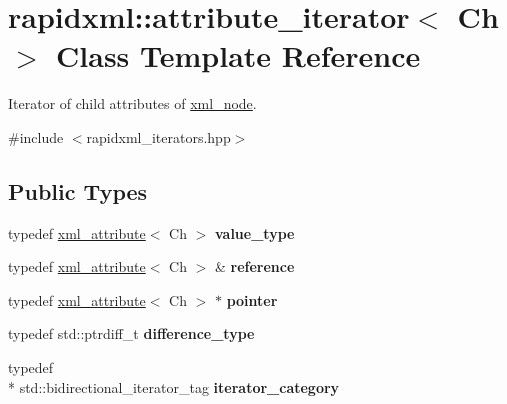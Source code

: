 \hypertarget{classrapidxml_1_1attribute__iterator}{\section{rapidxml\+:\+:attribute\+\_\+iterator$<$ Ch $>$ Class Template Reference}
\label{classrapidxml_1_1attribute__iterator}
}


Iterator of child attributes of \hyperlink{singletonrapidxml_1_1xml__node}{xml\+\_\+node}.  




{\ttfamily \#include $<$rapidxml\+\_\+iterators.\+hpp$>$}

\subsection*{Public Types}
\begin{DoxyCompactItemize}
\item 
\hypertarget{classrapidxml_1_1attribute__iterator_ad4280d358828ad9c3eb1a787decb162e}{typedef \hyperlink{singletonrapidxml_1_1xml__attribute}{xml\+\_\+attribute}$<$ Ch $>$ {\bfseries value\+\_\+type}}\label{classrapidxml_1_1attribute__iterator_ad4280d358828ad9c3eb1a787decb162e}

\item 
\hypertarget{classrapidxml_1_1attribute__iterator_a097343e44557de14de86b470d3f917d9}{typedef \hyperlink{singletonrapidxml_1_1xml__attribute}{xml\+\_\+attribute}$<$ Ch $>$ \& {\bfseries reference}}\label{classrapidxml_1_1attribute__iterator_a097343e44557de14de86b470d3f917d9}

\item 
\hypertarget{classrapidxml_1_1attribute__iterator_a69acc2e60270d6a062c03c9cb1cf2aa7}{typedef \hyperlink{singletonrapidxml_1_1xml__attribute}{xml\+\_\+attribute}$<$ Ch $>$ $\ast$ {\bfseries pointer}}\label{classrapidxml_1_1attribute__iterator_a69acc2e60270d6a062c03c9cb1cf2aa7}

\item 
\hypertarget{classrapidxml_1_1attribute__iterator_accfd6d8527d32b427496b42f71a2e37a}{typedef std\+::ptrdiff\+\_\+t {\bfseries difference\+\_\+type}}\label{classrapidxml_1_1attribute__iterator_accfd6d8527d32b427496b42f71a2e37a}

\item 
\hypertarget{classrapidxml_1_1attribute__iterator_a97ac5d8b98f5b03c68cc566f5ac0a9e0}{typedef \\*
std\+::bidirectional\+\_\+iterator\+\_\+tag {\bfseries iterator\+\_\+category}}\label{classrapidxml_1_1attribute__iterator_a97ac5d8b98f5b03c68cc566f5ac0a9e0}

\end{DoxyCompactItemize}
